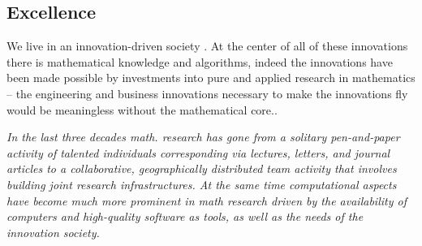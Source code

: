 \documentclass[noworkareas,deliverables,keys]{euproposal}                  %
\begin{document}
\begin{proposal}



\section{Excellence}


We live in an innovation-driven society . At the center of all of these innovations there is mathematical
knowledge and algorithms, indeed the innovations have been made possible by investments
into pure and applied research in mathematics -- the engineering and business innovations
necessary to make the innovations fly would be meaningless without the mathematical
core..

%




\begin{center}
\begin{boxedminipage}{.95\textwidth}\em 
In the last three decades math. research has gone from a solitary pen-and-paper activity of
talented individuals corresponding via lectures, letters, and journal articles to a
collaborative, geographically distributed team activity that involves building joint
research infrastructures. At the same time computational aspects have become much more
prominent in math research driven by the availability of computers and high-quality
software as tools, as well as the needs of the innovation society.
\end{boxedminipage}
\end{center}


\end{proposal}
\end{document}
